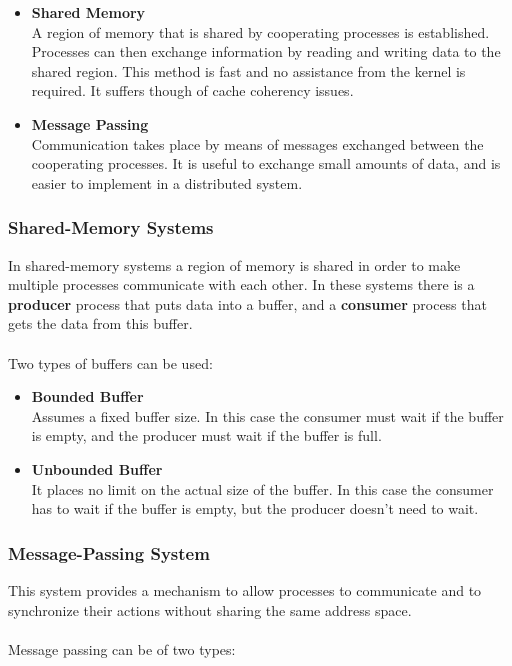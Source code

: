 \documentclass{article}
\begin{document}
\begin{itemize}
	\item \textbf{Shared Memory}
	\vspace{.2cm} \\
	A region of memory that is shared by cooperating processes is established. Processes can then exchange information by reading and writing data to the shared region. This method is fast and no assistance from the kernel is required. It suffers though of cache coherency issues.
	
	\item \textbf{Message Passing}
	\vspace{.2cm} \\
	Communication takes place by means of messages exchanged between the cooperating processes. It is useful to exchange small amounts of data, and is easier to implement in a distributed system.
\end{itemize}

\subsubsection{Shared-Memory Systems}
In shared-memory systems a region of memory is shared in order to make multiple processes communicate with each other. In these systems there is a \textbf{producer} process that puts data into a buffer, and a \textbf{consumer} process that gets the data from this buffer. \\ \\
Two types of buffers can be used:

\begin{itemize}
	\item \textbf{Bounded Buffer}
	\vspace{.2cm} \\
	Assumes a fixed buffer size. In this case the consumer must wait if the buffer is empty, and the producer must wait if the buffer is full.
	
	\item \textbf{Unbounded Buffer}
	\vspace{.2cm} \\
	It places no limit on the actual size of the buffer. In this case the consumer has to wait if the buffer is empty, but the producer doesn't need to wait.
\end{itemize}

\subsubsection{Message-Passing System}
This system provides a mechanism to allow processes to communicate and to synchronize their actions without sharing the same address space. \\ \\
Message passing can be of two types:
\end{document}
